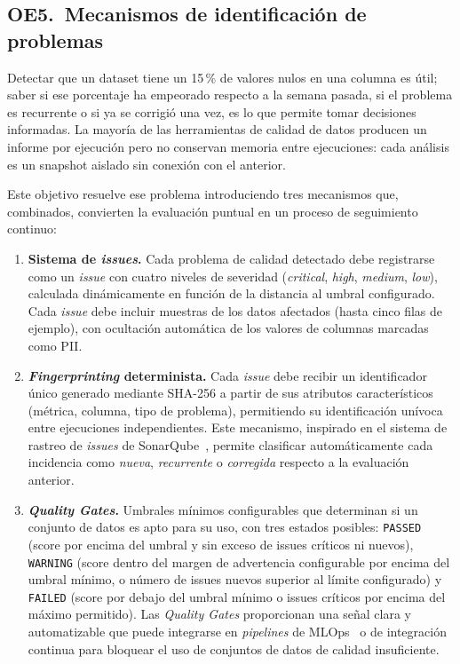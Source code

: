 \subsection{OE5.\ Mecanismos de identificación de problemas}
\label{sec:oe5}

Detectar que un dataset tiene un 15\,\% de valores nulos en una columna es
útil; saber si ese porcentaje ha empeorado respecto a la semana pasada, si el
problema es recurrente o si ya se corrigió una vez, es lo que permite tomar
decisiones informadas.  La mayoría de las herramientas de calidad de datos
producen un informe por ejecución pero no conservan memoria entre ejecuciones:
cada análisis es un snapshot aislado sin conexión con el anterior.

Este objetivo resuelve ese problema introduciendo tres mecanismos que,
combinados, convierten la evaluación puntual en un proceso de seguimiento
continuo:

\begin{enumerate}
  \item \textbf{Sistema de \emph{issues}.}  Cada problema de calidad
    detectado debe registrarse como un \emph{issue} con cuatro niveles de
    severidad (\emph{critical}, \emph{high}, \emph{medium}, \emph{low}),
    calculada dinámicamente en función de la distancia al umbral configurado.
    Cada \emph{issue} debe incluir muestras de los datos afectados (hasta
    cinco filas de ejemplo), con ocultación automática de los valores de
    columnas marcadas como \ac{PII}.

  \item \textbf{\emph{Fingerprinting} determinista.}  Cada \emph{issue} debe
    recibir un identificador único generado mediante \ac{SHA}-256 a partir de
    sus atributos característicos (métrica, columna, tipo de problema),
    permitiendo su identificación unívoca entre ejecuciones independientes.
    Este mecanismo, inspirado en el sistema de rastreo de \emph{issues} de
    SonarQube~\citep{sonarqube}, permite clasificar automáticamente cada
    incidencia como \emph{nueva}, \emph{recurrente} o \emph{corregida}
    respecto a la evaluación anterior.

  \item \textbf{\emph{Quality Gates}.}  Umbrales mínimos configurables que
    determinan si un conjunto de datos es apto para su uso, con tres estados
    posibles: \texttt{PASSED} (score por encima del umbral y sin exceso de
    issues críticos ni nuevos), \texttt{WARNING} (score dentro del margen de
    advertencia configurable por encima del umbral mínimo, o número de issues
    nuevos superior al límite configurado) y \texttt{FAILED} (score por debajo
    del umbral mínimo o issues críticos por encima del máximo permitido).
    Las \emph{Quality Gates} proporcionan una señal clara y automatizable
    que puede integrarse en \emph{pipelines} de
    \ac{MLOps}~\citep{kreuzberger2023} o de integración continua para
    bloquear el uso de conjuntos de datos de calidad insuficiente.
\end{enumerate}


